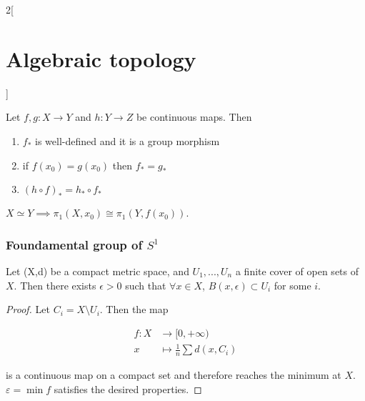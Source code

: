 \documentclass[../../../main_math.tex]{subfiles}
\begin{document}
\begin{multicols}{2}[\section{Algebraic topology}]
\begin{definition}
  \end{definition}

  \begin{proposition}
    Let $f,g:X\to Y$ and $h:Y \to Z $ be continuous maps. Then
    \begin{enumerate}
      \item $f_*$ is well-defined and it is a group morphism
      \item if $f(x_0)=g(x_0)$ then $f_*=g_*$
      \item $(h\circ f)_*=h_*\circ f_*$
    \end{enumerate}
  \end{proposition}

  \begin{corollary}
    $X\simeq Y \implies \pi_1 (X,x_0) \cong \pi_1 (Y,f(x_0))$.
  \end{corollary}


  \subsubsection{Foundamental group of $S^1$}

  \begin{lemma}
    Let (X,d) be a compact metric space, and $U_1, ..., U_n$ a finite cover of open sets of $X$. Then there exists $\epsilon>0$ such that $\forall x \in X$, $B(x,\epsilon)\subset U_i$ for some $i$.
  \end{lemma}

  \begin{proof}
    Let $C_i=X\setminus U_i$.  Then the map

    \begin{align*}
      f:X & \longrightarrow [0, +\infty)          \\
      x   & \longmapsto \frac{1}{n} \sum d(x,C_i)
    \end{align*}

    is a continuous map on a compact set and therefore reaches the minimum at $X$. $\varepsilon=\min f$ satisfies the desired properties.
  \end{proof}


\end{multicols}
\end{document}
